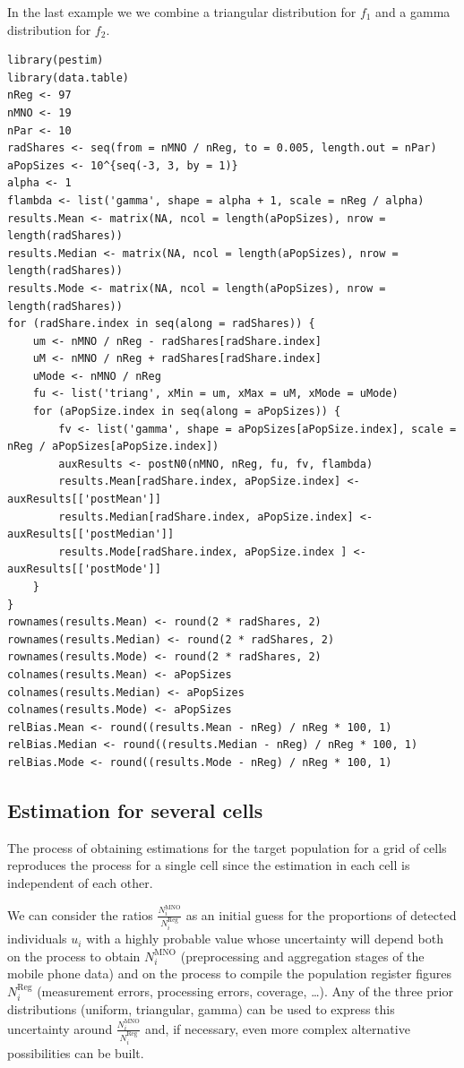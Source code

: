 \documentclass[12pt, a4paper]{article}
\begin{document}
In the last example we we combine a triangular distribution for $f_{1}$ and a gamma distribution for $f_{2}$.
\begin{verbatim}
library(pestim)
library(data.table)
nReg <- 97
nMNO <- 19
nPar <- 10
radShares <- seq(from = nMNO / nReg, to = 0.005, length.out = nPar)
aPopSizes <- 10^{seq(-3, 3, by = 1)}
alpha <- 1
flambda <- list('gamma', shape = alpha + 1, scale = nReg / alpha)
results.Mean <- matrix(NA, ncol = length(aPopSizes), nrow = length(radShares))
results.Median <- matrix(NA, ncol = length(aPopSizes), nrow = length(radShares))
results.Mode <- matrix(NA, ncol = length(aPopSizes), nrow = length(radShares))
for (radShare.index in seq(along = radShares)) {
    um <- nMNO / nReg - radShares[radShare.index]
    uM <- nMNO / nReg + radShares[radShare.index]
    uMode <- nMNO / nReg
    fu <- list('triang', xMin = um, xMax = uM, xMode = uMode)
    for (aPopSize.index in seq(along = aPopSizes)) {
        fv <- list('gamma', shape = aPopSizes[aPopSize.index], scale = nReg / aPopSizes[aPopSize.index])
        auxResults <- postN0(nMNO, nReg, fu, fv, flambda)
        results.Mean[radShare.index, aPopSize.index] <- auxResults[['postMean']] 
        results.Median[radShare.index, aPopSize.index] <- auxResults[['postMedian']]
        results.Mode[radShare.index, aPopSize.index ] <- auxResults[['postMode']]
    }
}
rownames(results.Mean) <- round(2 * radShares, 2)
rownames(results.Median) <- round(2 * radShares, 2)
rownames(results.Mode) <- round(2 * radShares, 2)
colnames(results.Mean) <- aPopSizes
colnames(results.Median) <- aPopSizes
colnames(results.Mode) <- aPopSizes
relBias.Mean <- round((results.Mean - nReg) / nReg * 100, 1)
relBias.Median <- round((results.Median - nReg) / nReg * 100, 1)
relBias.Mode <- round((results.Mode - nReg) / nReg * 100, 1)
\end{verbatim}


\subsection{Estimation for several cells}

The process of obtaining estimations for the target population for a grid of cells reproduces the process for a single cell
since the estimation in each cell is independent of each other.


We can consider the ratios $\frac{N_{i}^{\textrm{MNO}}}{N^{\textrm{Reg}}_{i}}$ 
as an initial guess for the proportions of detected individuals $u_{i}$ 
with a highly probable value whose uncertainty will depend both on the process to obtain $N_{i}^{\textrm{MNO}}$ 
(preprocessing and aggregation stages of the mobile phone data) 
and on the process to compile the population register figures $N_{i}^{\textrm{Reg}}$ 
(measurement errors, processing errors, coverage, \dots). 
Any of the three prior distributions (uniform, triangular, gamma) can be used to express this 
uncertainty around $\frac{N_{i}^{\textrm{MNO}}}{N^{\textrm{Reg}}_{i}}$ and, if necessary, 
even more complex alternative possibilities can be built.
\end{document}
